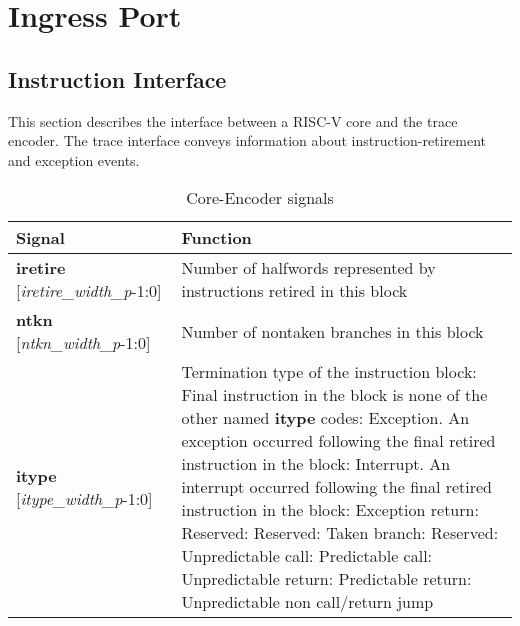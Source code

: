 \chapter{Ingress Port} \label{Interface}

\section{Instruction Interface}
This section describes the interface between a RISC-V core and the
trace encoder. The trace interface conveys information about
instruction-retirement and exception events.

\begin{table}[htp]
    \centering
    \caption{Core-Encoder signals}
    \label{tab:ingress}
    \begin{tabulary}{\textwidth}{|l|p{80mm}|}
        \hline
        \textbf {Signal} & \textbf {Function} \\
        \hline
        \textbf {iretire} [\textit{iretire\_width\_p}-1:0] & Number of halfwords represented by instructions retired in this block\\
        \hline
        \textbf {ntkn} [\textit{ntkn\_width\_p}-1:0] & Number of nontaken branches in this block\\
        \hline
        \textbf {itype} [\textit{itype\_width\_p}-1:0] & Termination type of the instruction block: Final instruction in the block is none of the other named \textbf{itype} codes: Exception. An exception occurred following the final retired instruction in the block: Interrupt. An interrupt occurred following the final retired instruction in the block: Exception return: Reserved: Reserved: Taken branch: Reserved: Unpredictable call: Predictable call: Unpredictable return: Predictable return: Unpredictable non call/return jump\newline

\end{tabulary}
\end{table}
